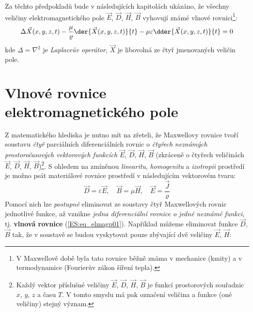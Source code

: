   Za těchto předpokladů bude v následujících kapitolách ukázáno, že všechny veličiny 
  elektromagnetického pole \(\vec{E}\), \(\vec{D}\), \(\vec{H}\), \(\vec{B}\) vyhovují známé vlnové 
  rovnici\footnote{V Maxwellově době byla tato rovnice běžně známa v mechanice (kmity) a v 
  termodynamice (Fourierův zákon šíření tepla).}:
  \begin{equation}\label{ES:eq_elmagp01}
    \Delta\vec{X}(x,y,z,t) - 
    \frac{\mu}{\varrho}\der{\vec{X}(x,y,z,t)}{t} - 
    \mu\varepsilon\dder{\vec{X}(x,y,z,t)}{t} = 0
  \end{equation}
  kde \(\Delta = \nabla^2\) je \emph{Laplaceův operátor}, \(\vec{X}\) je libovolná ze čtyř 
  jmenovaných veličin pole.
  
  \section{Vlnové rovnice elektromagnetického pole}
    Z matematického hlediska je nutno mít na zřeteli, že Maxwellovy rovnice tvoří soustavu 
    \emph{čtyř} parciálních diferenciálních rovnic o \emph{čtyřech} \emph{neznámých 
    prostoročasových vektorových funkcích} \(\vec{E}\), \(\vec{D}\), \(\vec{H}\), \(\vec{B}\) 
    (zkráceně o čtyřech veličinách \(\vec{E}\), \(\vec{D}\), \(\vec{H}\), 
    \(\vec{B}\))\footnote{Každý vektor příslušné veličiny \(\vec{E}\), \(\vec{D}\), \(\vec{H}\), 
    \(\vec{B}\) je funkcí prostorových souřadnic \(x\), \(y\), \(z\) a času \(T\). V tomto smyslu 
    má pak označení veličina a funkce (oné veličiny) stejný význam.}. S ohledem na zmíněnou 
    \emph{linearitu}, \emph{homogenitu} a \emph{izotropii} prostředí je možno psát materiálové 
    rovnice prostředí v následujícím vektorovém tvaru:
    \begin{equation}\label{ES:eq_elmagp02}
      \vec{D} = \varepsilon\vec{E}, \quad \vec{B} = \mu\vec{H}, \quad \vec{E} = 
      \frac{\vec{J}}{\varrho}
    \end{equation}
    Pomocí nich lze \emph{postupně} eliminovat ze soustavy čtyř Maxwellových rovnic jednotlivé 
    funkce, až vznikne \emph{jedna diferenciální rovnice o jedné neznámé funkci}, tj. 
    \textbf{vlnová rovnice} (\ref{ES:eq_elmagp01}). Například můžeme eliminovat funkce \(\vec{D}\), 
    \(\vec{B}\) tak, že v soustavě se budou vyskytovat pouze zbývající dvě veličiny \(\vec{E}\), 
    \(\vec{H}\):
